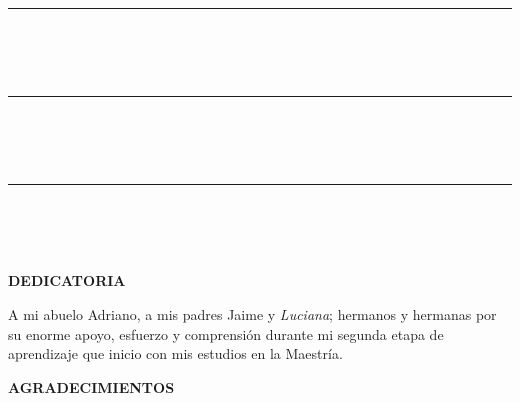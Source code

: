 \begin{center}
\begin{multicols}{2}
		\vspace{2.2cm}
		
		\rule[0.05cm]{7cm}{0.01cm}\\
		\fontsize{11pt}{10pt}\selectfont {\bf PhD. Eduardo Chavarri Velarde}\\
		\fontsize{12pt}{12pt}\selectfont {\bf MIEMBRO}\\				
		
		\vspace{2.2cm}
		
		\rule[0.05cm]{7cm}{0.01cm}\\
		\fontsize{11pt}{10pt}\selectfont {\bf Dr. Waldo Lavado Casimiro}\\
		\fontsize{12pt}{12pt}\selectfont {\bf PATROCINADOR}\\
		
		\vspace{2.2cm}
		
	\rule[0.05cm]{7cm}{0.01cm}\\
	\fontsize{11pt}{10pt}\selectfont {\bf Mg.Sc. Ricardo Apaclla Nalvarte}\\
	\fontsize{12pt}{12pt}\selectfont {\bf MIEMBRO}\\
	\end{multicols}
	\vspace{2.2cm}

\end{center}



\clearpage
\begin{center}
\large{\textbf {DEDICATORIA}}
\end{center}

\begin{flushright}
A mi abuelo Adriano, a mis padres Jaime y \textit{Luciana}; hermanos y hermanas por su enorme apoyo, esfuerzo y comprensión durante mi segunda etapa de aprendizaje que inicio con mis estudios en la Maestría.
\end{flushright}

\clearpage
\begin{center}
\large{\textbf {AGRADECIMIENTOS}}
\end{center}

